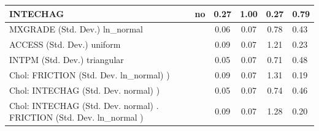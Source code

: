 \begin{table}
\begin{center}
\begin{tabular}{|l|l|c|c|c|l|}
			\hline
			INTECHAG & no & 0.27 & 1.00 & 0.27 & 0.79 \\
			\hline
			MXGRADE (Std. Dev.) ln_normal &  & 0.06 & 0.07 & 0.78 & 0.43 \\
			\hline
			ACCESS (Std. Dev.) uniform &  & 0.09 & 0.07 & 1.21 & 0.23 \\
			\hline
			INTPM (Std. Dev.) triangular &  & 0.05 & 0.07 & 0.71 & 0.48 \\
			\hline
			 Chol: FRICTION (Std. Dev. ln_normal) ) &  & 0.09 & 0.07 & 1.31 & 0.19 \\
			\hline
			 Chol: INTECHAG (Std. Dev. normal) ) &  & 0.05 & 0.07 & 0.74 & 0.46 \\
			\hline
			 Chol: INTECHAG (Std. Dev. normal) . FRICTION (Std. Dev.   ln_normal ) &  & 0.09 & 0.07 & 1.28 & 0.20 \\
			\hline
		\end{tabular}
	\end{center}
\end{table}